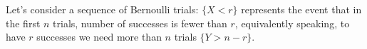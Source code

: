 
\setcounter{theorem}{23}
\begin{exercise} [BH.4.24]
\begin{solution}
    Let's consider a sequence of Bernoulli trials: $\{X<r\}$ represents the event that in the first $n$ trials, number of successes is fewer than $r$, equivalently speaking, to have $r$ successes we need more than $n$ trials $\{Y>n-r\}$.
\end{solution}
\end{exercise}


